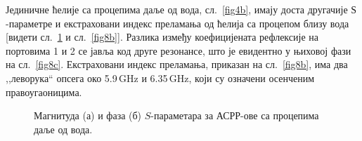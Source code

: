 Јединичне ћелије са процепима даље од вода, сл.~\ref{fig4b}, имају доста другачије $Ѕ$-параметре и екстраховани индекс преламања од ћелија са процепом близу вода [видети сл.~\ref{fig8} и сл.~\ref{fig8b}]. Разлика између коефицијената рефлексије на портовима 1 и 2 се јавља код друге резонансе, што је евидентно у њиховој фази на сл.~\ref{fig8c}. Екстраховани индекс преламања, приказан на сл.~\ref{fig8b}, има два ,,леворука`` опсега око 5.9\,GHz и 6.35\,GHz, који су означени осенченим правоугаоницима.
\begin{figure}[!t]
\hfill
{}
\caption{Магнитуда (а) и фаза (б) $S$-параметара за АСРР-ове са процепима даље од вода.}
\label{fig8}
\end{figure}
